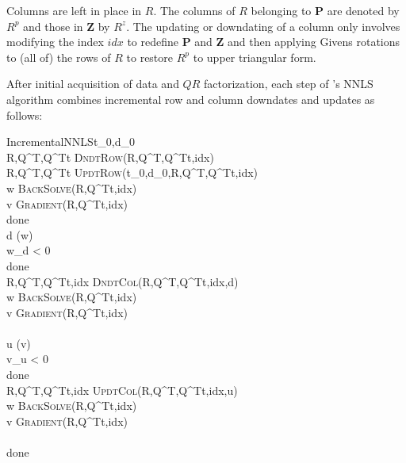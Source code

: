 Columns are left in place in $R$. The columns of $R$ belonging to \textbf{P} are denoted by $R^p$ and those in \textbf{Z} by $R^z$.
The updating or downdating of a column only involves modifying the index $idx$ to redefine \textbf{P} and \textbf{Z} and then
applying Givens rotations to (all of) the rows of $R$ to restore $R^p$ to upper triangular form. 

After initial acquisition of data and $QR$ factorization, each step of \pacora's NNLS algorithm
combines incremental row and column downdates and updates as follows:

\begin{pseudocode}{IncrementalNNLS}{t_0,d_0}
                              \\
R,Q^T,Q^Tt \GETS \textsc{DndtRow}(R,Q^T,Q^Tt,idx)           \\
R,Q^T,Q^Tt \GETS \textsc{UpdtRow}(t_0,d_0,R,Q^T,Q^Tt,idx)     \\
w \GETS \textsc{BackSolve}(R,Q^Tt,idx)                          \\
v \GETS \textsc{Gradient}(R,Q^Tt,idx)                    \\
\REPEAT
  done \GETS \TRUE                                              \\  
  d \GETS \arg\min(w)                                          \\
  \IF w_d < 0 \THEN                                            \\
  \BEGIN
    done \GETS \FALSE                                         \\
    R,Q^T,Q^Tt,idx \GETS \textsc{DndtCol}(R,Q^T,Q^Tt,idx,d)   \\
    w \GETS \textsc{BackSolve}(R,Q^Tt,idx)                    \\
    v \GETS \textsc{Gradient}(R,Q^Tt,idx)              \\
  \END                                                        \\
  u \GETS \arg\min(v)                                         \\
  \IF v_u < 0 \THEN                                           \\
  \BEGIN
    done \GETS \FALSE                                         \\
    R,Q^T,Q^Tt,idx \GETS \textsc{UpdtCol}(R,Q^T,Q^Tt,idx,u)     \\
    w \GETS \textsc{BackSolve}(R,Q^Tt,idx)                    \\
    v \GETS \textsc{Gradient}(R,Q^Tt,idx)              \\
  \END                                                        \\
\UNTIL done                                                   \\ 
                                                  \\     
\end{pseudocode}
 
